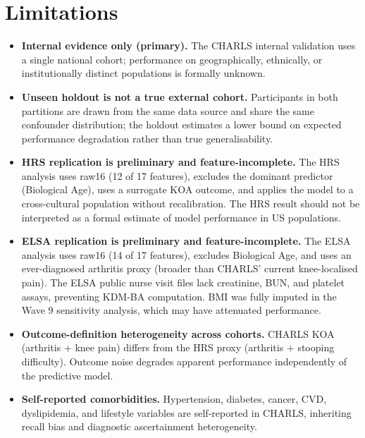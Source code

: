 \documentclass[11pt,a4paper]{article}
\begin{document}
\section{Limitations}
\begin{itemize}

\item \textbf{Internal evidence only (primary).} The CHARLS internal validation uses a single
national cohort; performance on geographically, ethnically, or institutionally distinct populations
is formally unknown.

\item \textbf{Unseen holdout is not a true external cohort.} Participants in both partitions are
drawn from the same data source and share the same confounder distribution; the holdout estimates a
lower bound on expected performance degradation rather than true generalisability.

\item \textbf{HRS replication is preliminary and feature-incomplete.} The HRS analysis uses raw16
(12 of 17 features), excludes the dominant predictor (Biological Age), uses a surrogate KOA
outcome, and applies the model to a cross-cultural population without recalibration. The HRS result
should not be interpreted as a formal estimate of model performance in US populations.

\item \textbf{ELSA replication is preliminary and feature-incomplete.} The ELSA analysis uses raw16
(14 of 17 features), excludes Biological Age, and uses an ever-diagnosed arthritis proxy (broader
than CHARLS' current knee-localised pain). The ELSA public nurse visit files lack creatinine, BUN,
and platelet assays, preventing KDM-BA computation. BMI was fully imputed in the Wave 9 sensitivity
analysis, which may have attenuated performance.

\item \textbf{Outcome-definition heterogeneity across cohorts.} CHARLS KOA (arthritis $+$ knee pain)
differs from the HRS proxy (arthritis $+$ stooping difficulty). Outcome noise degrades apparent
performance independently of the predictive model.

\item \textbf{Self-reported comorbidities.} Hypertension, diabetes, cancer, CVD, dyslipidemia, and
lifestyle variables are self-reported in CHARLS, inheriting recall bias and diagnostic ascertainment
heterogeneity.


\end{itemize}
\end{document}
